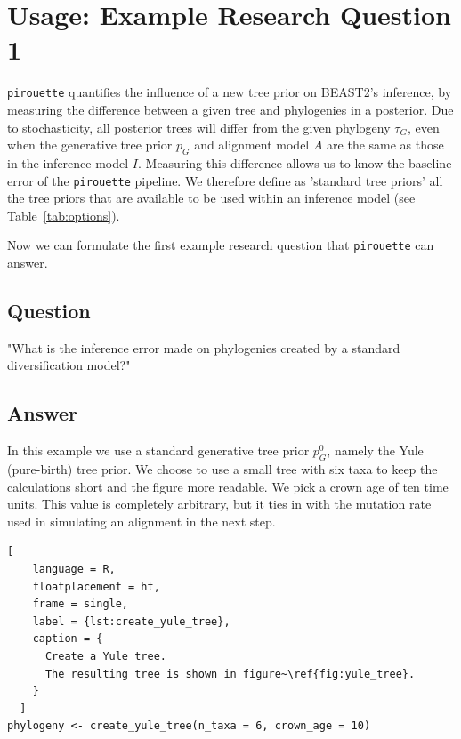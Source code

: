 \documentclass{article}
\begin{document}
\section{Usage: Example Research Question 1}

\verb;pirouette; quantifies the influence of a new tree prior on BEAST2's 
inference,
by measuring the difference between a given tree and 
phylogenies in a posterior. Due to stochasticity, all posterior trees
will differ from the given phylogeny $\tau_{\mathit{G}}$, 
even when the generative tree prior $\mathit{p_{G}}$ 
and alignment model $\mathit{A}$ are the same as 
those in the inference model $\mathit{I}$.
Measuring this difference allows us to know the baseline error
of the \verb;pirouette; pipeline. We therefore define as 'standard tree priors' 
all the tree priors that are available to be used within an inference model 
(see Table~\ref{tab:options}).

Now we can formulate the first example research question that \verb;pirouette; 
can answer.

\subsection{Question}

"What is the inference error made on phylogenies
created by a standard diversification model?"

\subsection{Answer}

In this example we use a standard generative tree prior $\mathit{p_{G}^0}$, 
namely the Yule (pure-birth) tree prior. 
We choose to use a small tree with six taxa to keep
the calculations short and the figure more readable.
We pick a crown age of ten time units. This value is 
completely arbitrary, but it ties in with the mutation rate 
used in simulating an alignment in the next step.

\begin{lstlisting}[
    language = R,
    floatplacement = ht,
    frame = single, 
    label = {lst:create_yule_tree}, 
    caption = {
      Create a Yule tree. 
      The resulting tree is shown in figure~\ref{fig:yule_tree}.
    }
  ]
phylogeny <- create_yule_tree(n_taxa = 6, crown_age = 10)
\end{lstlisting}
\end{document}
